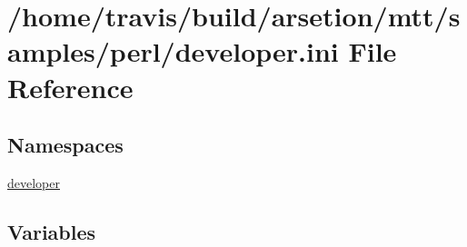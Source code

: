 \hypertarget{developer_8ini}{\section{/home/travis/build/arsetion/mtt/samples/perl/developer.ini File Reference}
\label{developer_8ini}
}
\subsection*{Namespaces}
\begin{DoxyCompactItemize}
\item 
\hyperlink{namespacedeveloper}{developer}
\end{DoxyCompactItemize}
\subsection*{Variables}
